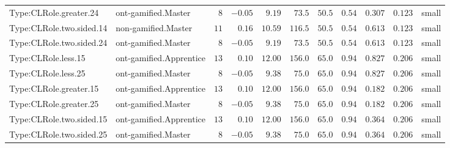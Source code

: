 \documentclass[6pt,a4paper]{article}
\begin{document}
{\begin{longtable}{llrrrrrrrrl}
Type:CLRole.greater.24&ont-gamified.Master&$ 8$&$-0.05$&$ 9.19$&$ 73.5$&$ 50.5$&$ 0.54$&$0.307$&$0.123$&small\tabularnewline
Type:CLRole.two.sided.14&non-gamified.Master&$11$&$ 0.16$&$10.59$&$116.5$&$ 50.5$&$ 0.54$&$0.613$&$0.123$&small\tabularnewline
Type:CLRole.two.sided.24&ont-gamified.Master&$ 8$&$-0.05$&$ 9.19$&$ 73.5$&$ 50.5$&$ 0.54$&$0.613$&$0.123$&small\tabularnewline
Type:CLRole.less.15&ont-gamified.Apprentice&$13$&$ 0.10$&$12.00$&$156.0$&$ 65.0$&$ 0.94$&$0.827$&$0.206$&small\tabularnewline
Type:CLRole.less.25&ont-gamified.Master&$ 8$&$-0.05$&$ 9.38$&$ 75.0$&$ 65.0$&$ 0.94$&$0.827$&$0.206$&small\tabularnewline
Type:CLRole.greater.15&ont-gamified.Apprentice&$13$&$ 0.10$&$12.00$&$156.0$&$ 65.0$&$ 0.94$&$0.182$&$0.206$&small\tabularnewline
Type:CLRole.greater.25&ont-gamified.Master&$ 8$&$-0.05$&$ 9.38$&$ 75.0$&$ 65.0$&$ 0.94$&$0.182$&$0.206$&small\tabularnewline
\newpage
Type:CLRole.two.sided.15&ont-gamified.Apprentice&$13$&$ 0.10$&$12.00$&$156.0$&$ 65.0$&$ 0.94$&$0.364$&$0.206$&small\tabularnewline
Type:CLRole.two.sided.25&ont-gamified.Master&$ 8$&$-0.05$&$ 9.38$&$ 75.0$&$ 65.0$&$ 0.94$&$0.364$&$0.206$&small\tabularnewline
\hline
\end{longtable}}
\end{document}
